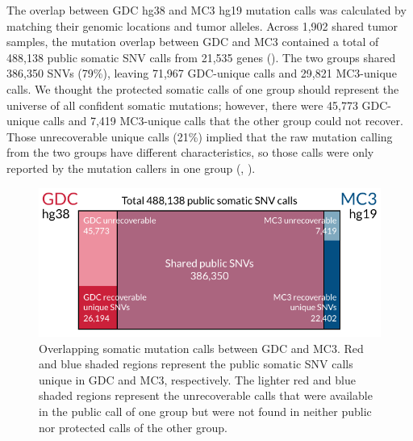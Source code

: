 The overlap between GDC hg38 and MC3 hg19 mutation calls was calculated by matching their genomic locations and tumor alleles. Across 1,902 shared tumor samples, the mutation overlap between GDC and MC3 contained a total of 488,138 public somatic SNV calls from 21,535 genes (). The two groups shared 386,350 SNVs (79\%), leaving 71,967 GDC-unique calls and 29,821 MC3-unique calls. We thought the protected somatic calls of one group should represent the universe of all confident somatic mutations; however, there were 45,773 GDC-unique calls and 7,419 MC3-unique calls that the other group could not recover. Those unrecoverable unique calls (21\%) implied that the raw mutation calling from the two groups have different characteristics, so those calls were only reported by the mutation callers in one group (, ).

\begin{figure}[tb]
    \centering
    \includegraphics[width=0.9\linewidth]{figures/chap02_mutation_pipeline_qc/overlap_venn_diagram.pdf}
    \caption[Overlapping somatic mutation calls between GDC and MC3.]{Overlapping somatic mutation calls between GDC and MC3. Red and blue shaded regions represent the public somatic SNV calls unique in GDC and MC3, respectively. The lighter red and blue shaded regions represent the unrecoverable calls that were available in the public call of one group but were not found in neither public nor protected calls of the other group.}
    \label{fig:mut-call-qc-venn-diagram}
\end{figure}

